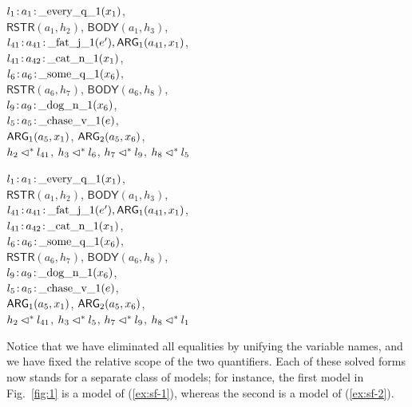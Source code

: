 \begin{examples}
\item \label{ex:sf-1}
  $l_1\colon\! a_1\colon\!\mathrm{\_every\_q\_1}(x_1)$,\\
\hspace*{0.1in}$\mathsf{RSTR}(a_1,h_2)$, $\mathsf{BODY}(a_1,h_3)$,\\
  $l_{41}\colon\! a_{41}\colon\!\mathrm{\_fat\_j\_1}(e'), \mathsf{ARG}_1(a_{41},x_1)$,\\
  $l_{41}\colon\! a_{42}\colon\!\mathrm{\_cat\_n\_1}(x_1)$,\\
  $l_6\colon\! a_6\colon\!\mathrm{\_some\_q\_1}(x_6)$,\\
\hspace*{0.1in}$\mathsf{RSTR}(a_6,h_7)$, $\mathsf{BODY}(a_6,h_8)$,\\
  $l_9\colon\! a_9\colon\!\mathrm{\_dog\_n\_1}(x_6)$,\\
  $l_5\colon\! a_5\colon\!\mathrm{\_chase\_v\_1}(e)$,\\
\hspace*{0.1in}  $\mathsf{ARG}_1(a_5,x_1)$, $\mathsf{ARG}_2(a_5,x_6)$,\\
  $h_2 \lhd^* l_{41}$, $h_3 \lhd^* l_6$,
  $h_7 \lhd^* l_9$, $h_8 \lhd^* l_5$
\item \label{ex:sf-2}
  $l_1\colon\! a_1\colon\!\mathrm{\_every\_q\_1}(x_1)$,\\
\hspace*{0.1in}$\mathsf{RSTR}(a_1,h_2)$, $\mathsf{BODY}(a_1,h_3)$,\\
  $l_{41}\colon\! a_{41}\colon\!\mathrm{\_fat\_j\_1}(e'), \mathsf{ARG}_1(a_{41},x_1)$,\\
  $l_{41}\colon\! a_{42}\colon\!\mathrm{\_cat\_n\_1}(x_1)$,\\
  $l_6\colon\! a_6\colon\!\mathrm{\_some\_q\_1}(x_6)$,\\
\hspace*{0.1in}$\mathsf{RSTR}(a_6,h_7)$, $\mathsf{BODY}(a_6,h_8)$,\\
  $l_9\colon\! a_9\colon\!\mathrm{\_dog\_n\_1}(x_6)$,\\
  $l_5\colon\! a_5\colon\!\mathrm{\_chase\_v\_1}(e)$,\\
\hspace*{0.1in}  $\mathsf{ARG}_1(a_5,x_1)$, $\mathsf{ARG}_2(a_5,x_6)$,\\
  $h_2 \lhd^* l_{41}$, $h_3 \lhd^* l_5$,
  $h_7 \lhd^* l_9$, $h_8 \lhd^* l_1$
\end{examples}

Notice that we have eliminated all equalities by unifying the variable
names, and we have fixed the relative scope of the two quantifiers.
Each of these solved forms now stands for a separate class of models;
for instance, the first model in Fig.~\ref{fig:1} is a model of
(\ref{ex:sf-1}), whereas the second is a model of (\ref{ex:sf-2}).



